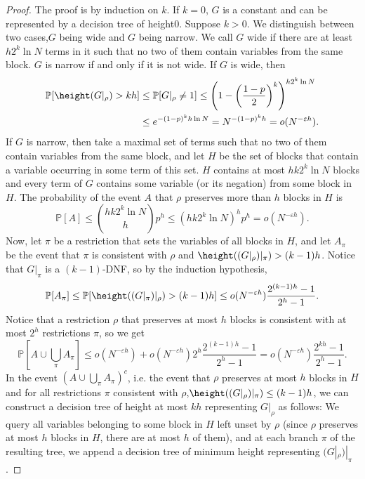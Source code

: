 \begin{proof}
The proof is by induction on $k$. If $k=0$, $G$ is a constant and can be represented by a decision tree of height0. Suppose $k>0$. We distinguish between two cases,$G$ being wide and $G$ being narrow. We call $G$ wide if there are at least $h2^k\ln N$ terms in it such that no two of them contain variables from the same block. $G$ is narrow if and only if it is not wide. If $G$ is wide, then
\begin{align*}
\mathbb P[\height(G|_\rho)>kh]&\le\mathbb P[G|_\rho\ne1]\le\left(1-\left(\frac{1-p}{2}\right)^k\right)^{h2^k\ln N}\\
&\le e^{-(1-p)^k h\ln N}=N^{-(1-p)^kh}=o(N^{-\varepsilon h}).
\end{align*}
If $G$ is narrow, then take a maximal set of terms such that no two of them contain variables from the same block, and let $H$ be the set of blocks that contain a variable occurring in some term of this set. $H$ contains at most $hk2^k\ln N$ blocks and every term of $G$ contains some variable (or its negation) from some block in $H$. The probability of the event $A$ that $\rho$ preserves more than $h$ blocks in $H$ is
\[\mathbb P[A]\le\binom{hk2^k\ln N}{h}p^h\le(hk2^k\ln N)^hp^h=o(N^{-\varepsilon h}).\]
Now, let $\pi$ be a restriction that sets the variables of all blocks in $H$, and let $A_\pi$ be the event that $\pi$ is consistent with $\rho$ and $\height((G|_\rho)|_\pi)>(k-1)h$. Notice that $G|_\pi$ is a $(k-1)$-DNF, so by the induction hypothesis,
\[\mathbb P[A_\pi]\le\mathbb P[\height((G|_\pi)|_\rho)>(k-1)h]\le o(N^{-\varepsilon h})\frac{2^{(k-1)h}-1}{2^h-1}.\]
Notice that a restriction $\rho$ that preserves at most $h$ blocks is consistent with at most $2^h$ restrictions $\pi$, so we get
\[\mathbb P\left[A\cup\bigcup_\pi A_\pi\right]\le o(N^{-\varepsilon h})+o(N^{-\varepsilon h})2^h\frac{2^{(k-1)h}-1}{2^h-1}=o(N^{-\varepsilon h})\frac{2^{kh}-1}{2^h-1}.\]
In the event $\left(A\cup\bigcup_\pi A_\pi\right)^c$, i.e. the event that $\rho$ preserves at most $h$ blocks in $H$ and for all restrictions $\pi$ consistent with $\rho$,$\height((G|_\rho)|_\pi)\le(k-1)h$, we can construct a decision tree of height at most $kh$ representing $G|_\rho$ as follows: We query all variables belonging to some block in $H$ left unset by $\rho$ (since $\rho$ preserves at most $h$ blocks in $H$, there are at most $h$ of them), and at each branch $\pi$ of the resulting tree, we append a decision tree of minimum height representing $(G|_\rho)|_\pi$.
\end{proof}
